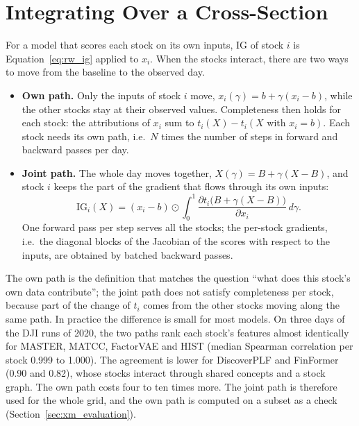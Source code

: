 \section{Integrating Over a Cross-Section}
\label{sec:xm_path}

For a model that scores each stock on its own inputs, IG of stock $i$ is Equation~\ref{eq:rw_ig} applied to $x_i$. When the stocks interact, there are two ways to move from the baseline to the observed day.

\begin{itemize}
    \item \textbf{Own path.} Only the inputs of stock $i$ move, $x_i(\gamma) = b + \gamma (x_i - b)$, while the other stocks stay at their observed values. Completeness then holds for each stock: the attributions of $x_i$ sum to $t_i(X) - t_i(X \text{ with } x_i = b)$. Each stock needs its own path, i.e.\ $N$ times the number of steps in forward and backward passes per day.
    \item \textbf{Joint path.} The whole day moves together, $X(\gamma) = B + \gamma (X - B)$, and stock $i$ keeps the part of the gradient that flows through its own inputs:
    \begin{equation}
        \label{eq:xm_joint}
        \mathrm{IG}_{i}(X) = (x_i - b) \odot \int_0^1 \frac{\partial t_i\big(B + \gamma (X - B)\big)}{\partial x_i} \, d\gamma .
    \end{equation}
    One forward pass per step serves all the stocks; the per-stock gradients, i.e.\ the diagonal blocks of the Jacobian of the scores with respect to the inputs, are obtained by batched backward passes.
\end{itemize}

The own path is the definition that matches the question ``what does this stock's own data contribute''; the joint path does not satisfy completeness per stock, because part of the change of $t_i$ comes from the other stocks moving along the same path. In practice the difference is small for most models. On three days of the DJI runs of 2020, the two paths rank each stock's features almost identically for MASTER, MATCC, FactorVAE and HIST (median Spearman correlation per stock 0.999 to 1.000). The agreement is lower for DiscoverPLF and FinFormer (0.90 and 0.82), whose stocks interact through shared concepts and a stock graph. The own path costs four to ten times more.
The joint path is therefore used for the whole grid, and the own path is computed on a subset as a check (Section~\ref{sec:xm_evaluation}).

